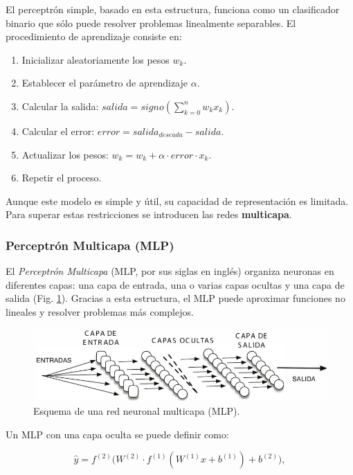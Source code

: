 El perceptrón simple, basado en esta estructura, funciona como un clasificador binario que sólo puede resolver problemas linealmente separables. El procedimiento de aprendizaje consiste en:

\begin{enumerate}
    \item Inicializar aleatoriamente los pesos $w_{k}$.
    \item Establecer el parámetro de aprendizaje $\alpha$.
    \item Calcular la salida: $salida = signo(\sum_{k=0}^{n} w_{k} x_{k})$.
    \item Calcular el error: $error = salida_{deseada} - salida$.
    \item Actualizar los pesos: $w_{k} = w_{k} + \alpha \cdot error \cdot x_{k}$.
    \item Repetir el proceso.
\end{enumerate}

Aunque este modelo es simple y útil, su capacidad de representación es limitada. Para superar estas restricciones se introducen las redes \textbf{multicapa}.

\subsubsection*{Perceptrón Multicapa (MLP)}

El \textit{Perceptrón Multicapa} (MLP, por sus siglas en inglés) organiza neuronas en diferentes capas: una capa de entrada, una o varias capas ocultas y una capa de salida (Fig. \ref{fig:MLP}). Gracias a esta estructura, el MLP puede aproximar funciones no lineales y resolver problemas más complejos.

\begin{figure}[H]
    \centering
    \includegraphics[scale=0.6]{figuras/MLP.png}
    \caption{Esquema de una red neuronal multicapa (MLP).}
    \label{fig:MLP}
\end{figure}

Un MLP con una capa oculta se puede definir como:

\begin{equation}
\hat{y} = f^{(2)}\Big( W^{(2)} \cdot f^{(1)}( W^{(1)} x + b^{(1)} ) + b^{(2)} \Big),
\end{equation}

